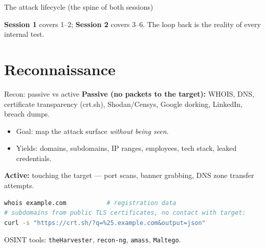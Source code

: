\documentclass[aspectratio=169,11pt]{beamer}
\begin{document}
\begin{frame}{The attack lifecycle (the spine of both sessions)}
  \centering
  \vspace{0.3em}
  \par\footnotesize \textcolor{kaliBlue}{\textbf{Session 1}} covers 1--2;
  \textcolor{kaliBlue}{\textbf{Session 2}} covers 3--6. The loop back is the
  reality of every internal test.
\end{frame}

\section{Reconnaissance}
\begin{frame}[fragile]{Recon: passive vs active}
  \textbf{Passive (no packets to the target):} WHOIS, DNS, certificate
  transparency (crt.sh), Shodan/Censys, Google dorking, LinkedIn, breach dumps.
  \begin{itemize}\footnotesize
    \item Goal: map the attack surface \emph{without being seen}.
    \item Yields: domains, subdomains, IP ranges, employees, tech stack, leaked
          credentials.
  \end{itemize}
  \textbf{Active:} touching the target --- port scans, banner grabbing, DNS
  zone transfer attempts.
  \begin{lstlisting}[language=bash]
whois example.com           # registration data
# subdomains from public TLS certificates, no contact with target:
curl -s "https://crt.sh/?q=%25.example.com&output=json"
  \end{lstlisting}
  \footnotesize OSINT tools: \texttt{theHarvester}, \texttt{recon-ng},
  \texttt{amass}, \texttt{Maltego}.
\end{frame}
\end{document}
